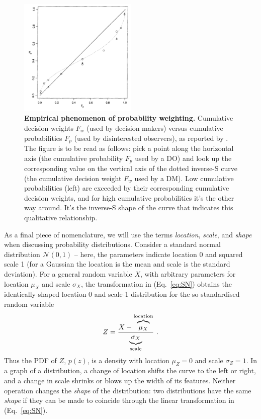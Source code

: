 \documentclass[a4paper, 12pt]{article}
\newcommand{\elabel}[1]{\label{eq:#1}}
\newcommand{\eref}[1]{(Eq.~\ref{eq:#1})}
\newcommand{\flabel}[1]{\label{fig:#1}}
\newcommand{\be}{\begin{equation}}
\newcommand{\ee}{\end{equation}}
\newcommand{\ND}{\mathcal{N}} %
\begin{document}
\begin{figure}[!htb]
\centering
\includegraphics[width=0.5\textwidth]{./figs/TK1992.PNG}
\caption{{\bf Empirical phenomenon of probability weighting.} Cumulative decision weights $F_w$ (used by decision makers) versus cumulative probabilities $F_p$ (used by disinterested observers), as reported by \citet[p.~310, Fig. 1, relabelled axes]{TverskyKahneman1992}. The figure is to be read as follows: pick a point along the horizontal axis (the cumulative probability $F_p$ used by a DO) and look up the corresponding value on the vertical axis of the dotted inverse-S curve (the cumulative decision weight $F_w$ used by a DM). Low cumulative probabilities (left) are exceeded by their corresponding cumulative decision weights, and for high cumulative probabilities it's the other way around. It's the inverse-S shape of the curve that indicates this qualitative relationship.}
\flabel{TK1992}
\end{figure}

As a final piece of nomenclature, we will use the terms \textit{location}, \textit{scale}, and {\it shape} when discussing probability distributions. Consider a standard normal distribution $\ND(0,1)$ -- here, the parameters indicate location 0 and squared scale 1 (for a Gaussian the location is the mean and scale is the standard deviation). For a general random variable $X$, with arbitrary parameters for location $\mu_X$ and scale $\sigma_X$, the transformation in \eref{SN} obtains the identically-shaped location-0 and scale-1 distribution for the so standardised random variable
\be \elabel{SN}
	Z = \frac{X-\overbrace{\mu_X \mathstrut}^{\text{location}}}{\underbrace{\sigma_X\mathstrut}_{\text{scale}}}
~.
\ee
Thus the PDF of $Z$, $p(z)$, is a density with location $\mu_Z=0$ and scale $\sigma_Z=1$. In a graph of a distribution, a change of location shifts the curve to the left or right, and a change in scale shrinks or blows up the width of its features. Neither operation changes the {\it shape} of the distribution: two distributions have the same {\it shape} if they can be made to coincide through the linear transformation in \eref{SN}.
\end{document}
